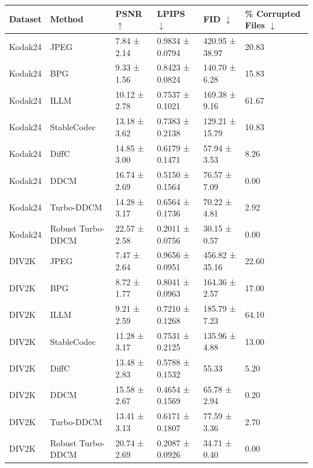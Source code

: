 \begin{tabular}{llllll}
\toprule
Dataset & Method & PSNR $\uparrow$ & LPIPS $\downarrow$ & FID $\downarrow$ & \% Corrupted Files $\downarrow$ \\
\midrule
Kodak24 & JPEG & 7.84 ± 2.14 & 0.9834 ± 0.0794 & 420.95 ± 38.97 & 20.83 \\
Kodak24 & BPG & 9.33 ± 1.56 & 0.8423 ± 0.0824 & 140.70 ± 6.28 & 15.83 \\
Kodak24 & ILLM & 10.12 ± 2.78 & 0.7537 ± 0.1021 & 169.38 ± 9.16 & 61.67 \\
Kodak24 & StableCodec & 13.18 ± 3.62 & 0.7383 ± 0.2138 & 129.21 ± 15.79 & 10.83 \\
Kodak24 & DiffC & 14.85 ± 3.00 & 0.6179 ± 0.1471 & 57.94 ± 3.53 & 8.26 \\
Kodak24 & DDCM & 16.74 ± 2.69 & 0.5150 ± 0.1564 & 76.57 ± 7.09 & 0.00 \\
Kodak24 & Turbo-DDCM & 14.28 ± 3.17 & 0.6564 ± 0.1736 & 70.22 ± 4.81 & 2.92 \\
Kodak24 & Robust Turbo-DDCM & 22.57 ± 2.58 & 0.2011 ± 0.0756 & 30.15 ± 0.57 & 0.00 \\
DIV2K & JPEG & 7.47 ± 2.64 & 0.9656 ± 0.0951 & 456.82 ± 35.16 & 22.60 \\
DIV2K & BPG & 8.72 ± 1.77 & 0.8041 ± 0.0963 & 164.36 ± 2.57 & 17.00 \\
DIV2K & ILLM & 9.21 ± 2.59 & 0.7210 ± 0.1268 & 185.79 ± 7.23 & 64.10 \\
DIV2K & StableCodec & 11.28 ± 3.17 & 0.7531 ± 0.2125 & 135.96 ± 4.88 & 13.00 \\
DIV2K & DiffC & 13.48 ± 2.83 & 0.5788 ± 0.1532 & 55.33 & 5.20 \\
DIV2K & DDCM & 15.58 ± 2.67 & 0.4654 ± 0.1569 & 65.78 ± 2.94 & 0.20 \\
DIV2K & Turbo-DDCM & 13.41 ± 3.13 & 0.6171 ± 0.1807 & 77.59 ± 3.36 & 2.70 \\
DIV2K & Robust Turbo-DDCM & 20.74 ± 2.69 & 0.2087 ± 0.0926 & 34.71 ± 0.40 & 0.00 \\
\bottomrule
\end{tabular}
